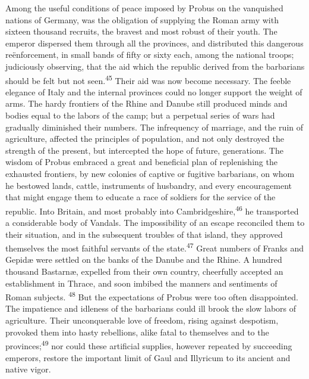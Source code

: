 Among the useful conditions of peace imposed by Probus on the
vanquished nations of Germany, was the obligation of supplying
the Roman army with sixteen thousand recruits, the bravest and
most robust of their youth. The emperor dispersed them through
all the provinces, and distributed this dangerous reënforcement,
in small bands of fifty or sixty each, among the national troops;
judiciously observing, that the aid which the republic derived
from the barbarians should be felt but not seen.\textsuperscript{45} Their aid was
now become necessary. The feeble elegance of Italy and the
internal provinces could no longer support the weight of arms.
The hardy frontiers of the Rhine and Danube still produced minds
and bodies equal to the labors of the camp; but a perpetual
series of wars had gradually diminished their numbers. The
infrequency of marriage, and the ruin of agriculture, affected
the principles of population, and not only destroyed the strength
of the present, but intercepted the hope of future, generations.
The wisdom of Probus embraced a great and beneficial plan of
replenishing the exhausted frontiers, by new colonies of captive
or fugitive barbarians, on whom he bestowed lands, cattle,
instruments of husbandry, and every encouragement that might
engage them to educate a race of soldiers for the service of the
republic. Into Britain, and most probably into Cambridgeshire,\textsuperscript{46}
he transported a considerable body of Vandals. The impossibility
of an escape reconciled them to their situation, and in the
subsequent troubles of that island, they approved themselves the
most faithful servants of the state.\textsuperscript{47} Great numbers of Franks
and Gepidæ were settled on the banks of the Danube and the Rhine.
A hundred thousand Bastarnæ, expelled from their own country,
cheerfully accepted an establishment in Thrace, and soon imbibed
the manners and sentiments of Roman subjects. \textsuperscript{48} But the
expectations of Probus were too often disappointed. The
impatience and idleness of the barbarians could ill brook the
slow labors of agriculture. Their unconquerable love of freedom,
rising against despotism, provoked them into hasty rebellions,
alike fatal to themselves and to the provinces;\textsuperscript{49} nor could
these artificial supplies, however repeated by succeeding
emperors, restore the important limit of Gaul and Illyricum to
its ancient and native vigor.


